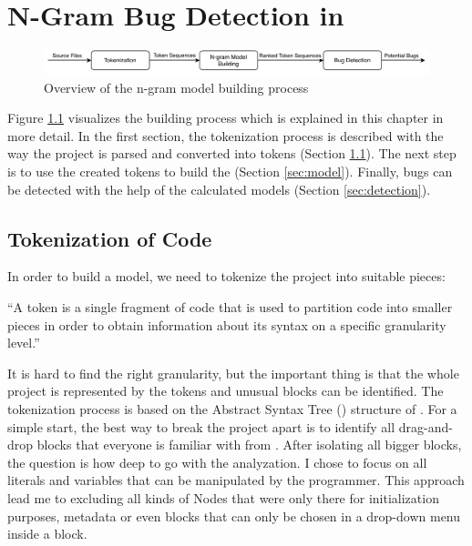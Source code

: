 \chapter{N-Gram Bug Detection in \scratch{}}\label{chap:methods}

\begin{figure}[hbtp]
\centering
\includegraphics[scale=0.75]{images/Overview.pdf}
\caption{Overview of the n-gram model building process}
\label{fig:overview}
\end{figure}

Figure \ref{fig:overview} visualizes the \ngram{} building process which is explained in this chapter in more detail. In the first section, the tokenization process is described with the way the \scratch{} project is parsed and converted into tokens (Section \ref{sec:tokenization}). The next step is to use the created tokens to build the  (Section \ref{sec:model}). Finally, bugs can be detected with the help of the calculated models (Section \ref{sec:detection}).

\section{Tokenization of \scratch{} Code}\label{sec:tokenization}
In order to build a model, we need to tokenize the \scratch{} project into suitable pieces:

\begin{definition}[Token]\label{def:token}
    ``A token is a single fragment of \scratch{} code that is used to partition code into smaller pieces in order to obtain information about its syntax on a specific granularity level.''
\end{definition}

It is hard to find the right granularity, but the important thing is that the whole project is represented by the tokens and unusual blocks can be identified. The tokenization process is based on the Abstract Syntax Tree (\AST{}) structure of \litterbox{}. For a simple start, the best way to break the project apart is to identify all drag-and-drop blocks that everyone is familiar with from \scratch{}. After isolating all bigger blocks, the question is how deep to go with the analyzation. I chose to focus on all literals and variables that can be manipulated by the \scratch{} programmer. This approach lead me to excluding all kinds of \AST{}Nodes that were only there for initialization purposes, metadata or even blocks that can only be chosen in a drop-down menu inside a block.  

